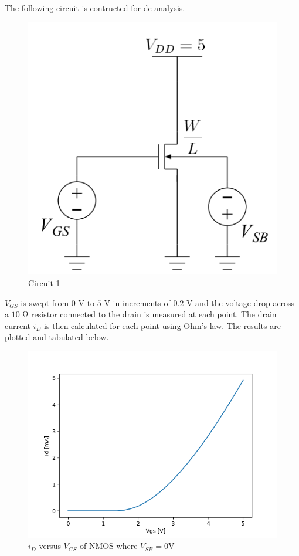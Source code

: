 The following circuit is contructed for dc analysis.

\FloatBarrier

\begin{figure}[h!]
	\centering
	\includegraphics[scale=0.75]{./images/circuit_1.PNG}
	\caption{Circuit 1}
	\label{fig:circuit_1}
\end{figure}

\FloatBarrier

$V_{GS}$ is swept from $0$ \si{\volt} to $5$ \si{\volt} in increments of $0.2$ \si{\volt} and the voltage drop across a $10$ \si{\ohm} resistor connected to the drain is measured at each point. 
The drain current $i_D$ is then calculated for each point using Ohm's law.
The results are plotted and tabulated below.

\FloatBarrier

\begin{figure}[h!]
	\centering
	\includegraphics[scale=0.75]{./images/data_1.PNG}
	\caption{$i_{D}$ versus $V_{GS}$ of NMOS where $V_{SB}= 0$\si{\volt}}
	\label{fig:data_1}
\end{figure}

